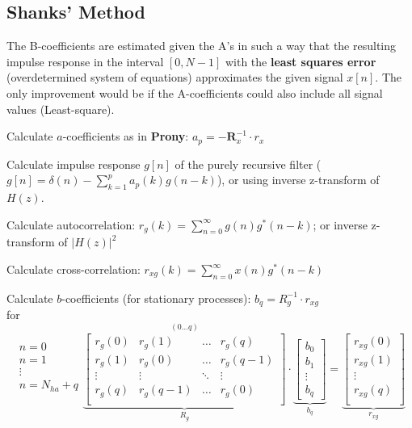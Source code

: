 \subsection{Shanks' Method }

The B-coefficients are estimated given the A's in such a way that the resulting impulse response in the interval $[0, N - 1]$ with the
\textbf{least squares error} (overdetermined system of equations) approximates the given
signal $x[n]$. The only improvement would be if the A-coefficients could also include all signal values (Least-square).

\begin{aufzaehlung}
  		\item Calculate $a$-coefficients as in \textbf{Prony}: $a_p = - \bm R_x^{-1} \cdot r_x$
  		\item Calculate impulse response $g[n]$ of the purely recursive filter ($g[n] = \delta(n)- \sum\limits_{k=1}^p a_p(k)g(n-k)$),
  		or using inverse z-transform of $H(z)$.
  		\item Calculate autocorrelation:  $r_g(k)=\sum\limits_{n=0}^\infty g(n)g^*(n-k)$; or inverse z-transform of $|H(z)|^2$
  		\item Calculate cross-correlation: $r_{xg}(k)=\sum\limits_{n=0}^\infty x(n)g^*(n-k)$
  		\item Calculate $b$-coefficients (for stationary processes): $b_q = R_g^{-1} \cdot r_{xg}$ \\
  		for\\

		 $$\begin{matrix}n=0\\ n=1\\ \vdots\\ n=N_{ha}+q\\ \end{matrix}
		\overset{(0 \hdots q)}{\underbrace{\begin{bmatrix}
    		r_g(0) & r_g(1) & \hdots & r_g(q) \\
    		r_g(1) & r_g(0) & \hdots & r_g(q-1) \\
    		\vdots & \vdots & \ddots & \vdots \\
    		r_g(q) &r_g(q-1) & \hdots & r_g(0) \\
		\end{bmatrix}  }_{R_g}} \cdot \underbrace{\begin{bmatrix}
    		b_0 \\
    		b_1 \\
    		\vdots \\
    		b_q
		\end{bmatrix}  }_{b_q}= \underbrace{\begin{bmatrix}
    		r_{xg}(0) \\
    		r_{xg}(1) \\
    		\vdots \\
    		r_{xg}(q) \\
		\end{bmatrix}  }_{r_{xg}} $$
\end{aufzaehlung}

